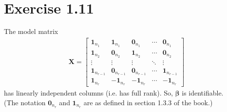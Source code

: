 \section*{Exercise 1.11}
The model matrix
\begin{align*}
\bm{X} = 
\begin{bmatrix}
\bm{1}_{n_{1}} & \bm{1}_{n_{1}} & \bm{0}_{n_{1}} & \cdots & \bm{0}_{n_{1}}\\
\bm{1}_{n_{2}} & \bm{0}_{n_{2}} & \bm{1}_{n_{2}} & \cdots & \bm{0}_{n_{2}}\\
\vdots & \vdots & \vdots & \ddots & \vdots\\
\bm{1}_{n_{r-1}} & \bm{0}_{n_{r-1}} & \bm{0}_{n_{r-1}} & \cdots & \bm{1}_{n_{r-1}}\\
\bm{1}_{n_{r}} & -\bm{1}_{n_{r}} & -\bm{1}_{n_{r}} & \cdots & -\bm{1}_{n_{r}}
\end{bmatrix}
\end{align*}
has linearly independent columns (i.e. has full rank). So, $\bm{\beta}$ is identifiable.\\
(The notation $\bm{0}_{n_{r}}$ and $\bm{1}_{n_{r}}$ are as defined in section 1.3.3 of the book.)
